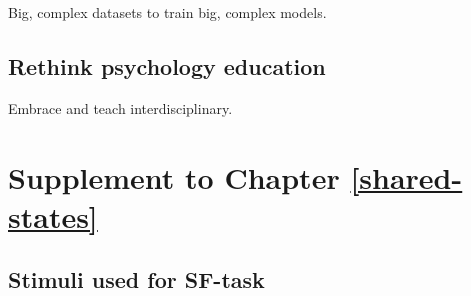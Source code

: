 \documentclass[12pt,american,a4paper,oneside,]{memoir} %
\begin{document}
Big, complex datasets to train big, complex models.

\hypertarget{rethink-psychology-education}{%
\section{Rethink psychology education}\label{rethink-psychology-education}}

Embrace and teach interdisciplinary.

\hypertarget{appendix-appendix}{%
\appendix}


\cleardoublepage
{}
{}
\appendixpage*
\setlength\beforechapskip{-\baselineskip}

\hypertarget{shared-states-supplement}{%
\chapter{Supplement to Chapter \ref{shared-states}}\label{shared-states-supplement}}

\hypertarget{stimuli-used-for-sf-task}{%
\section{Stimuli used for SF-task}\label{stimuli-used-for-sf-task}}

\begingroup\fontsize{10}{12}\selectfont
\end{document}

